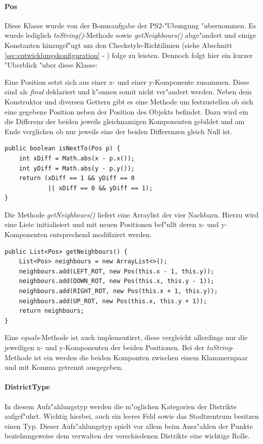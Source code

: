 \paragraph{Pos}
\label{par:pos}
Diese Klasse wurde von der Bonusaufgabe der PS2-"Ubungung "ubernommen. Es wurde lediglich \emph{toString()}-Methode sowie \emph{getNeighbours()} abge"andert und einige Konstanten hinzugef"ugt um den Checkstyle-Richtilinien 
(siehe Abschnitt \ref{sec:entwicklungskonfiguration} - ) 
folge zu leisten. Dennoch folgt hier ein kurzer "Uberblick "uber diese Klasse: 

Eine Position setzt sich aus einer x- und einer y-Komponente zusammen. Diese sind als \emph{final} deklariert und k"onnen somit nicht ver"andert werden. Neben dem Konstruktor und diversen Gettern gibt es eine Methode um festzustellen ob sich eine gegebene Position neben der Position des Objekts befindet. Dazu wird ein die Differenz der beiden jeweils gleichnamigen Komponenten gebildet und am Ende verglichen ob nur jeweils eine der beiden Differenzen gleich Null ist. 

\begin{lstlisting}[style=CodeHighlighting]
public boolean isNextTo(Pos p) {
    int xDiff = Math.abs(x - p.x());
	int yDiff = Math.abs(y - p.y());
	return (xDiff == 1 && yDiff == 0
            || xDiff == 0 && yDiff == 1);
}
\end{lstlisting}

Die Methode \emph{getNeighbours()} liefert eine Arraylist der vier Nachbarn. Hierzu wird eine Liste initialisiert und mit neuen Positionen bef"ullt deren x- und y-Komponenten entsprechend modifiziert werden. 

\begin{lstlisting}[style=CodeHighlighting]
public List<Pos> getNeighbours() {
    List<Pos> neighbours = new ArrayList<>();
    neighbours.add(LEFT_ROT, new Pos(this.x - 1, this.y));
    neighbours.add(DOWN_ROT, new Pos(this.x, this.y - 1));
    neighbours.add(RIGHT_ROT, new Pos(this.x + 1, this.y));
    neighbours.add(UP_ROT, new Pos(this.x, this.y + 1));
    return neighbours;
}
\end{lstlisting}


Eine \emph{equals}-Methode ist auch implementiert, diese vergleicht allerdings nur die jeweiligen x- und y-Komponenten der beiden Positionen. Bei der \emph{toString}-Methode ist ein werden die beiden Komponten zwischen einem Klammernpaar und mit Komma getrennt ausgegeben. 

\paragraph{DistrictType}
\label{par:districtType}
In diesem Aufz"ahlungstyp werden die m"oglichen Kategorien der Distrikte aufgef"uhrt. Wichtig hierbei, auch ein leeres Feld sowie das Stadtzentrum besitzen einen Typ. 
Dieser Aufz"ahlungstyp spielt vor allem beim Ausz"ahlen der Punkte beziehungsweise dem verwalten der verschiedenen Distrikte eine wichtige Rolle. 

